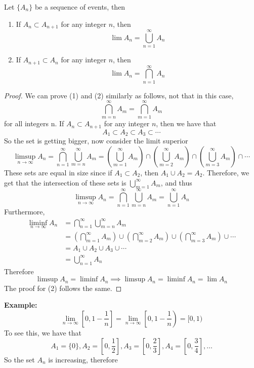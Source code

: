 \documentclass[openany]{report}
\begin{document}
\begin{lemma}
    Let $\{A_n\}$ be a sequence of events, then 
    \begin{enumerate}
        \item If $A_n \subset A_{n+1}$ for any integer $n$, then 
        \[\lim A_n = \bigcup_{n=1}^\infty A_n\]
        \item If $A_{n+1} \subset A_n$ for any integer $n$, then
        \[\lim A_n = \bigcap_{n=1}^\infty A_n\]
    \end{enumerate}
\end{lemma}
\begin{proof}
    We can prove (1) and (2) similarly as follows, not that in this case, 
    \[\bigcap_{m=n}^\infty A_m = \bigcap_{m=1}^\infty A_m\]
    for all integers n. If $A_n \subset A_{n+1}$ for any integer $n$, then we have that 
    \[A_1 \subset A_2 \subset A_3 \subset \cdots \]
    So the set is getting bigger, now consider the limit superior 
    \[\limsup_{n\rightarrow\infty} A_n = \bigcap_{n=1}^\infty \bigcup_{m=n}^\infty A_m= \left(\bigcup_{m=1}^\infty A_m\right) \cap \left(\bigcup_{m=2}^\infty A_m\right) \cap \left(\bigcup_{m=3}^\infty A_m\right) \cap \cdots\]
    These sets are equal in size since if $A_1 \subset A_2$, then $A_1 \cup A_2 = A_2$. Therefore, we get that the intersection of these sets is $\bigcup\limits_{m=1}^\infty A_m$, and thus 
    \[\limsup_{n\rightarrow \infty} A_n = \bigcap_{n=1}^\infty\bigcup_{m=n}^\infty A_m = \bigcup_{n=1}^\infty A_n\]
    Furthermore, 
    \begin{align*}
        \liminf_{n\rightarrow\infty} A_n &= \bigcap_{n=1}^\infty \bigcup_{m=n}^\infty A_m\\
        &= \left(\bigcap_{m=1}^\infty A_m\right) \cup \left(\bigcap_{m=2}^\infty A_m\right) \cup \left(\bigcap_{m=3}^\infty A_m\right) \cup \cdots \\
        &=  A_1 \cup A_2 \cup A_3 \cup \cdots \\
        &= \bigcup_{n=1}^\infty A_n
    \end{align*}
    Therefore 
    \[\limsup A_n = \liminf A_n \implies \limsup A_n = \liminf A_n = \lim A_n\]
    The proof for (2) follows the same. 
\end{proof}
\noindent
\textbf{Example:} 
\[\lim_{n\rightarrow\infty} \left[0, 1 - \frac{1}{n}\right] = \lim_{n\rightarrow\infty} \left[0, 1 - \frac{1}{n}\right) = [0,1)\]
To see this, we have that 
\[A_1 = \{0\}, A_2 = \left[0,\frac{1}{2}\right], A_3 = \left[0,\frac{2}{3}\right],A_4 = \left[0,\frac{3}{4}\right], \ldots \]
So the set $A_n$ is increasing, therefore 
\end{document}
